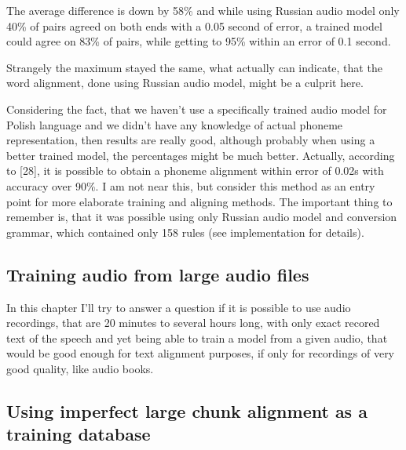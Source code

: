 \documentclass[12pt,a4paper,english]{article}
\begin{document}
\newpage

The average difference is down by 58\% and while using Russian audio model only 40\% of pairs agreed on both ends with a 0.05 second of error, a trained model could agree on 83\% of pairs, while getting to 95\% within an error of 0.1 second. \newline

Strangely the maximum stayed the same, what actually can indicate, that the word alignment, done using Russian audio model, might be a culprit here. \newline

Considering the fact, that we haven't use a specifically trained audio model for Polish language and we didn't have any knowledge of actual phoneme representation, then results are really good, although probably when using a better trained model, the percentages might be much better. \newline
Actually, according to [28], it is possible to obtain a phoneme alignment within error of 0.02s with accuracy over 90\%. I am not near this, but consider this method as an entry point for more elaborate training and aligning methods. \newline
The important thing to remember is, that it was possible using only Russian audio model and conversion grammar, which contained only 158 rules (see implementation for details). 

\newpage
\begin{center}
    \section{Training audio from large audio files}
\end {center}
\setcounter{equation}{0}

In this chapter I'll try to answer a question if it is possible to use audio recordings, that are 20 minutes to several hours long, with only exact recored text of the speech and yet being able to train a model from a given audio, that would be good enough for text alignment purposes, if only for recordings of very good quality, like audio books. \newline \newline

\subsection{Using imperfect large chunk alignment as a training database}
\end{document}
